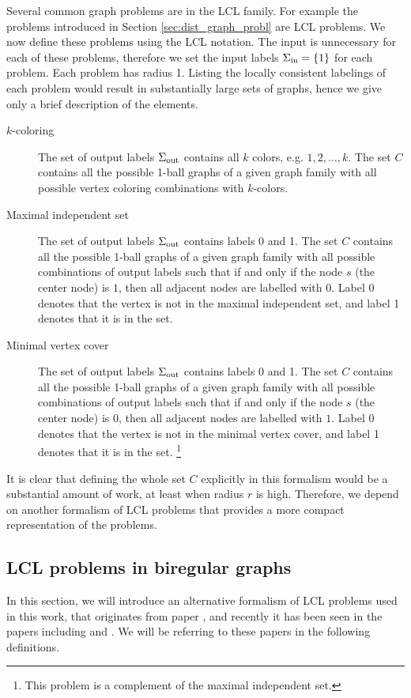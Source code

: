 Several common graph problems are in the LCL family.
For example the problems introduced in Section \ref{sec:dist_graph_probl} are LCL problems.
We now define these problems using the LCL notation.
The input is unnecessary for each of these problems,
therefore we set the input labels $\Sigma_{\text{in}} = \{1\}$ for each problem.
Each problem has radius 1.
Listing the locally consistent labelings of each problem would result in substantially large sets of graphs, hence we give only a brief description of the elements.
\begin{description}
  \item[$k$-coloring] The set of output labels $\Sigma_{\text{out}}$ contains all $k$ colors, e.g. $1, 2, \dotsc, k$.
  The set $C$ contains all the possible 1-ball graphs of a given graph family with all possible vertex coloring combinations with $k$-colors.
  \item[Maximal independent set]
  The set of output labels $\Sigma_{\text{out}}$ contains labels 0 and 1.
  The set $C$ contains all the possible 1-ball graphs of a given graph family with all possible combinations of output labels such that if and only if the node $s$ (the center node) is $1$, then all adjacent nodes are labelled with $0$.
  Label 0 denotes that the vertex is not in the maximal independent set, and label 1 denotes that it is in the set.
  \item[Minimal vertex cover]
  The set of output labels $\Sigma_{\text{out}}$ contains labels 0 and 1.
  The set $C$ contains all the possible 1-ball graphs of a given graph family with all possible combinations of output labels such that if and only if the node $s$ (the center node) is $0$, then all adjacent nodes are labelled with $1$.
  Label 0 denotes that the vertex is not in the minimal vertex cover, and label 1 denotes that it is in the set.
  \footnote{This problem is a complement of the maximal independent set.}
\end{description}

It is clear that defining the whole set $C$ explicitly in this formalism would be a substantial amount of work, at least when radius $r$ is high.
Therefore, we depend on another formalism of LCL problems that provides a more compact representation of the problems.


\subsection{LCL problems in biregular graphs} \label{sec:lcl_problems:biregular}
In this section, we will introduce an alternative formalism of LCL problems used in this work, that originates from paper \cite{DBLP:conf/podc/Brandt19}, and recently it has been seen in the papers including \cite{DBLP:conf/podc/Olivetti20} and \cite{DBLP:journals/sigact/Suomela20}.
We will be referring to these papers in the following definitions.

